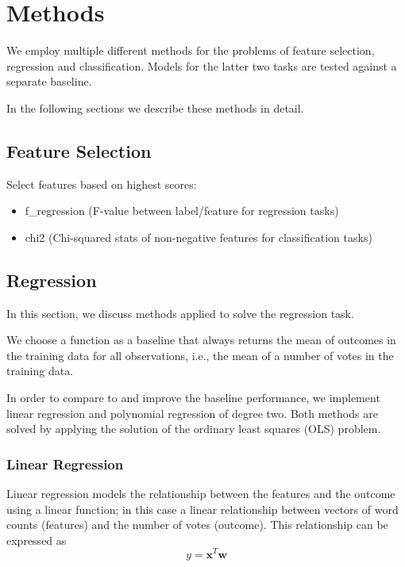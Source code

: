 \section{Methods}
\label{sec:two}

We employ multiple different methods for the problems of feature selection,
regression and classification.  Models for the latter two tasks are tested
against a separate baseline.

In the following sections we describe these methods in detail.

\subsection{Feature Selection}

Select features based on highest scores:

\begin{itemize}
\item f\_regression (F-value between label/feature for regression tasks)
\item chi2 (Chi-squared stats of non-negative features for classification tasks)
\end{itemize}

\subsection{Regression}

In this section, we discuss methods applied to solve the regression task.

We choose a function as a baseline that always returns the mean of outcomes in
the training data for all observations, i.e., the mean of a number of votes in
the training data.

In order to compare to and improve the baseline performance, we implement linear
regression and polynomial regression of degree two.  Both methods are solved by
applying the solution of the ordinary least squares (OLS) problem.

\subsubsection{Linear Regression}

Linear regression models the relationship between the features and the outcome
using a linear function; in this case a linear relationship between vectors of
word counts (features) and the number of votes (outcome).  This relationship can
be expressed as
\[
  y = \mathbf{x}^T\mathbf{w}
\]

